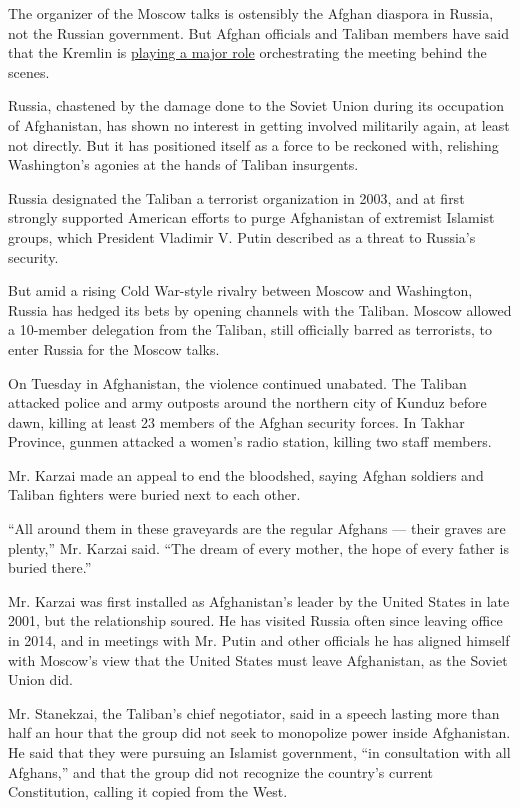 The organizer of the Moscow talks is ostensibly the Afghan diaspora in
Russia, not the Russian government. But Afghan officials and Taliban
members have said that the Kremlin is
\href{https://www.nytimes.com/2019/02/02/world/asia/taliban-moscow-ghani-talks.html}{playing
a major role} orchestrating the meeting behind the scenes.

Russia, chastened by the damage done to the Soviet Union during its
occupation of Afghanistan, has shown no interest in getting involved
militarily again, at least not directly. But it has positioned itself as
a force to be reckoned with, relishing Washington's agonies at the hands
of Taliban insurgents.

Russia designated the Taliban a terrorist organization in 2003, and at
first strongly supported American efforts to purge Afghanistan of
extremist Islamist groups, which President Vladimir V. Putin described
as a threat to Russia's security.

But amid a rising Cold War-style rivalry between Moscow and Washington,
Russia has hedged its bets by opening channels with the Taliban. Moscow
allowed a 10-member delegation from the Taliban, still officially barred
as terrorists, to enter Russia for the Moscow talks.

On Tuesday in Afghanistan, the violence continued unabated. The Taliban
attacked police and army outposts around the northern city of Kunduz
before dawn, killing at least 23 members of the Afghan security forces.
In Takhar Province, gunmen attacked a women's radio station, killing two
staff members.

Mr. Karzai made an appeal to end the bloodshed, saying Afghan soldiers
and Taliban fighters were buried next to each other.

``All around them in these graveyards are the regular Afghans --- their
graves are plenty,'' Mr. Karzai said. ``The dream of every mother, the
hope of every father is buried there.''

Mr. Karzai was first installed as Afghanistan's leader by the United
States in late 2001, but the relationship soured. He has visited Russia
often since leaving office in 2014, and in meetings with Mr. Putin and
other officials he has aligned himself with Moscow's view that the
United States must leave Afghanistan, as the Soviet Union did.

Mr. Stanekzai, the Taliban's chief negotiator, said in a speech lasting
more than half an hour that the group did not seek to monopolize power
inside Afghanistan. He said that they were pursuing an Islamist
government, ``in consultation with all Afghans,'' and that the group did
not recognize the country's current Constitution, calling it copied from
the West.

